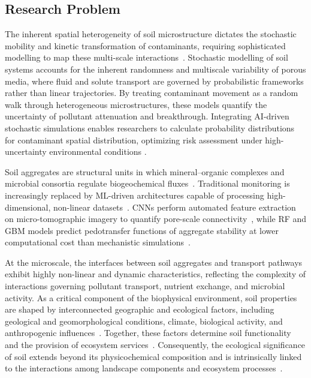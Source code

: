 \documentclass[environremediat,article,accept,pdftex,oneauthor]{Definitions/mdpi}
\begin{document}
\subsection{Research Problem}\label{sec1.2}

The inherent spatial heterogeneity of soil microstructure dictates the
stochastic mobility and kinetic transformation of contaminants, requiring
sophisticated modelling to map these multi-scale interactions~\cite{2018.05.005}.
Stochastic modelling of soil systems accounts for the inherent randomness and
multiscale variability of porous media, where fluid and solute transport are
governed by probabilistic frameworks rather than linear trajectories. By treating contaminant movement as a random
walk through heterogeneous microstructures, these models quantify the
uncertainty of pollutant attenuation and breakthrough.
Integrating AI-driven stochastic simulations enables researchers to calculate
probability distributions for contaminant spatial distribution,
optimizing risk assessment under high-uncertainty environmental conditions
\cite{Olawade}.

{Soil aggregates are structural units in which mineral--organic complexes and microbial consortia regulate biogeochemical fluxes~\cite{Six2004}. Traditional monitoring is increasingly replaced by ML-driven architectures capable of processing high-dimensional, non-linear datasets~\cite{Lal2015,Baveye2016}. CNNs perform automated feature extraction on micro-tomographic imagery to quantify pore-scale connectivity~\cite{Demiral2026,Chen2025}, while RF and GBM models predict pedotransfer functions of aggregate stability at lower computational cost than mechanistic simulations~\cite{Guo2026}.}

At the microscale, the interfaces between soil aggregates and transport
pathways exhibit highly non-linear and dynamic characteristics, reflecting the
complexity of interactions governing pollutant transport, nutrient exchange,
and microbial activity. As a critical component of the biophysical environment,
soil properties are shaped by interconnected geographic and ecological factors,
including geological and geomorphological conditions, climate, biological
activity, and anthropogenic influences~\cite{Wangetal2010,Brevik2015,Wu168627}.
Together, these factors determine soil functionality and the provision of
ecosystem services~\cite{Baveye2016,Klaucol2013,Klaucol2017}.
Consequently, the ecological significance of soil extends beyond its
physicochemical composition and is intrinsically linked to the interactions
among landscape components and ecosystem processes~\cite{Lemenkova2025d}.
\end{document}
